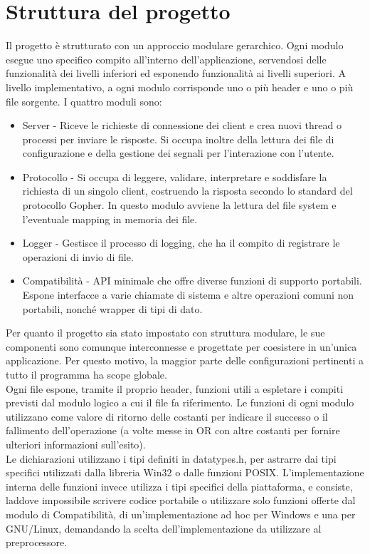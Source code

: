 \documentclass{article}
\begin{document}
\section{Struttura del progetto}

Il progetto è strutturato con un approccio modulare gerarchico. 
Ogni modulo esegue uno specifico compito all'interno dell'applicazione, servendosi delle funzionalità
dei livelli inferiori ed esponendo funzionalità ai livelli superiori.
A livello implementativo, a ogni modulo corrisponde uno o più header e uno o più file sorgente.
I quattro moduli sono:
\begin{itemize}
    \item Server - Riceve le richieste di connessione dei client e crea nuovi thread 
    o processi per inviare le risposte. Si occupa inoltre della lettura dei file di configurazione e 
    della gestione dei segnali per l'interazione con l'utente.
    \item Protocollo - Si occupa di leggere, validare, interpretare e soddisfare la richiesta di un singolo client,
    costruendo la risposta secondo lo standard del protocollo Gopher. 
    In questo modulo avviene la lettura del file system e l'eventuale mapping 
    in memoria dei file.
    \item Logger - Gestisce il processo di logging, che ha il compito di registrare le operazioni di invio
    di file.
    \item Compatibilità - API minimale che offre diverse funzioni di supporto portabili. Espone interfacce
    a varie chiamate di sistema e altre operazioni comuni non portabili, nonché wrapper di tipi di dato.
\end{itemize} 

Per quanto il progetto sia stato impostato con struttura modulare, le sue componenti sono 
comunque interconnesse e progettate per coesistere in un'unica applicazione. 
Per questo motivo, la maggior parte delle configurazioni pertinenti a tutto il programma ha scope globale.\\
Ogni file espone, tramite il proprio header, funzioni utili a espletare
i compiti previsti dal modulo logico a cui il file fa riferimento. Le funzioni di ogni modulo
utilizzano come valore di ritorno delle costanti per indicare il successo o il fallimento dell'operazione (a volte
messe in OR con altre costanti per fornire ulteriori informazioni sull'esito).
\\Le dichiarazioni utilizzano i tipi definiti in datatypes.h, per astrarre dai tipi specifici utilizzati
dalla libreria Win32 o dalle funzioni POSIX. L'implementazione interna delle funzioni invece
 utilizza i tipi specifici della piattaforma, e consiste, laddove impossibile scrivere codice portabile o utilizzare solo funzioni offerte dal 
modulo di Compatibilità, di un'implementazione ad hoc per Windows e una per GNU/Linux, demandando la scelta dell'implementazione
da utilizzare al preprocessore.
\end{document}
